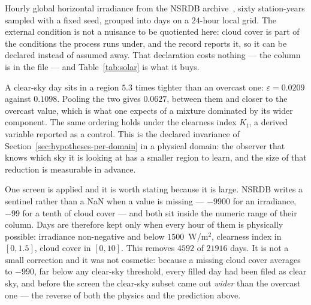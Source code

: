 \documentclass[10pt]{article}
\theoremstyle{plain}
\theoremstyle{definition}
\theoremstyle{remark}
\newcommand{\fitwidth}[1]{%
  \resizebox{\ifdim\width>\linewidth\linewidth\else\width\fi}{!}{#1}}
\begin{document}
Hourly global horizontal irradiance from the NSRDB
archive~\citep{sengupta2018nsrdb}, sixty station-years
sampled with a fixed seed, grouped into days on a $24$-hour local grid. The
external condition is not a nuisance to be quotiented here: cloud cover is part
of the conditions the process runs under, and the record reports it, so it can
be declared instead of assumed away. That declaration costs nothing --- the
column is in the file --- and Table~\ref{tab:solar} is what it buys.

A clear-sky day sits in a region $5.3$ times tighter than an overcast one:
$\varepsilon = 0.0209$ against $0.1098$. Pooling the two gives $0.0627$, between
them and closer to the overcast value, which is what one expects of a mixture
dominated by its wider component. The same ordering holds under the clearness
index $K_t$, a derived variable reported as a control. This is the declared
invariance of Section~\ref{sec:hypotheses-per-domain} in a physical domain: the
observer that knows which sky it is looking at has a smaller region to learn,
and the size of that reduction is measurable in advance.

One screen is applied and it is worth stating because it is large. NSRDB writes
a sentinel rather than a NaN when a value is missing --- $-9900$ for an
irradiance, $-99$ for a tenth of cloud cover --- and both sit inside the numeric
range of their column. Days are therefore kept only when every hour of them is
physically possible: irradiance non-negative and below $1500$~W/m$^2$, clearness
index in $[0, 1.5]$, cloud cover in $[0, 10]$. This removes $4592$ of $21916$
days. It is not a small correction and it was not cosmetic: because a missing
cloud cover averages to $-990$, far below any clear-sky threshold, every filled
day had been filed as clear sky, and before the screen the clear-sky subset came
out \emph{wider} than the overcast one --- the reverse of both the physics and
the prediction above.

\begin{table}[!htbp]\centering\small
\fitwidth{}
\caption{\small Irradiance under a declared sky condition. $\varepsilon$ is the
median within-set distance and $|S|$ the covering number at it; compression is
against the amplitude-adjusted surrogate of Section~\ref{sec:surrogates}. GHI is
the measured irradiance and $K_t$ the clearness index derived from it, reported
as a control on the choice of variable. The split is declared by the data: the
total cloud cover the record itself carries.}
\label{tab:solar}
\end{table}
\end{document}
